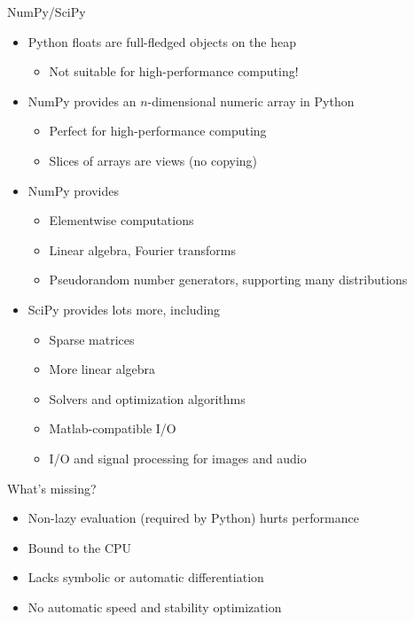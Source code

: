 \documentclass[utf8x,xcolor=pdftex,dvipsnames,table]{beamer}
\begin{document}
\begin{frame}{NumPy/SciPy}
  \begin{itemize}
  \item Python floats are full-fledged objects on the heap
      \begin{itemize}
      \item Not suitable for high-performance computing!
      \end{itemize}

  \item NumPy provides an $n$-dimensional numeric array in Python
      \begin{itemize}
      \item Perfect for high-performance computing
      \item Slices of arrays are views (no copying)
      \end{itemize}

  \item NumPy provides
      \begin{itemize}
      \item Elementwise computations
      \item Linear algebra, Fourier transforms
      \item Pseudorandom number generators, supporting many distributions
      \end{itemize}

  \item SciPy provides lots more, including
      \begin{itemize}
      \item Sparse matrices
      \item More linear algebra
      \item Solvers and optimization algorithms
      \item Matlab-compatible I/O
      \item I/O and signal processing for images and audio
      \end{itemize}
  \end{itemize}
\end{frame}

\begin{frame}{What's missing?}
  \begin{itemize}
    \item Non-lazy evaluation (required by Python) hurts performance
    \item Bound to the CPU
    \item Lacks symbolic or automatic differentiation
    \item No automatic speed and stability optimization
  \end{itemize}

\end{frame}
\end{document}
